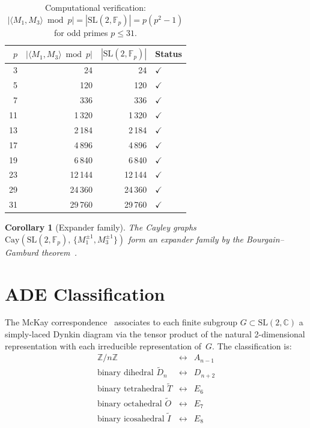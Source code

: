 \documentclass[12pt]{amsart}
\newtheorem{corollary}[theorem]{Corollary}
\theoremstyle{definition}
\theoremstyle{remark}
\newcommand{\SL}{\mathrm{SL}}
\newcommand{\Fp}{\mathbb{F}_p}
\newcommand{\Z}{\mathbb{Z}}
\newcommand{\C}{\mathbb{C}}
\begin{document}
\begin{table}[ht]
\centering
\caption{Computational verification: $|\langle M_1, M_3 \rangle \bmod p|
= |\SL(2,\Fp)| = p(p^2-1)$ for odd primes $p \le 31$.}
\label{tab:sl2fp}
\begin{tabular}{rrrl}
\toprule
$p$ & $|\langle M_1,M_3\rangle \bmod p|$ & $|\SL(2,\Fp)|$ & Status \\
\midrule
3  & 24     & 24     & $\checkmark$ \\
5  & 120    & 120    & $\checkmark$ \\
7  & 336    & 336    & $\checkmark$ \\
11 & 1\,320   & 1\,320   & $\checkmark$ \\
13 & 2\,184   & 2\,184   & $\checkmark$ \\
17 & 4\,896   & 4\,896   & $\checkmark$ \\
19 & 6\,840   & 6\,840   & $\checkmark$ \\
23 & 12\,144  & 12\,144  & $\checkmark$ \\
29 & 24\,360  & 24\,360  & $\checkmark$ \\
31 & 29\,760  & 29\,760  & $\checkmark$ \\
\bottomrule
\end{tabular}
\end{table}

\begin{corollary}[Expander family]\label{cor:expander}
The Cayley graphs $\mathrm{Cay}(\SL(2,\Fp),\,\{M_1^{\pm1}, M_3^{\pm1}\})$
form an expander family by the Bourgain--Gamburd theorem~\cite{bourgain-gamburd}.
\end{corollary}

\section{ADE Classification}\label{sec:ade}

The McKay correspondence~\cite{mckay} associates to each finite subgroup
$G \subset \SL(2,\C)$ a simply-laced Dynkin diagram via the tensor
product of the natural 2-dimensional representation with each irreducible
representation of~$G$.  The classification is:
\[
\begin{array}{lcl}
\Z/n\Z & \longleftrightarrow & A_{n-1} \\
\text{binary dihedral } \widetilde{D}_n & \longleftrightarrow & D_{n+2} \\
\text{binary tetrahedral } \widetilde{T} & \longleftrightarrow & E_6 \\
\text{binary octahedral } \widetilde{O} & \longleftrightarrow & E_7 \\
\text{binary icosahedral } \widetilde{I} & \longleftrightarrow & E_8
\end{array}
\]
\end{document}
